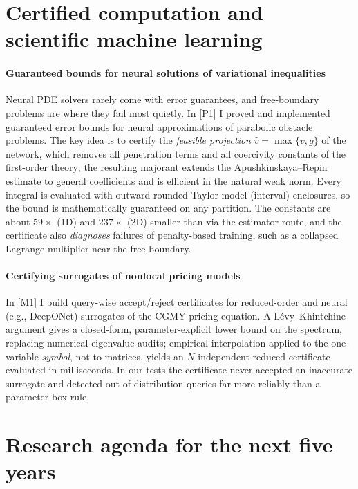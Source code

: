 \documentclass[11pt]{article}
\newcommand{\rc}[1]{\textcolor{accent}{[#1]}}
\begin{document}
\section{Certified computation and scientific machine learning}

\paragraph{Guaranteed bounds for neural solutions of variational inequalities}
Neural PDE solvers rarely come with error guarantees, and free-boundary
problems are where they fail most quietly. In \rc{P1} I proved and implemented
guaranteed error bounds for neural approximations of parabolic obstacle
problems. The key idea is to certify the \emph{feasible projection}
$\hat v=\max\{v,g\}$ of the network, which removes all penetration terms and all
coercivity constants of the first-order theory; the resulting majorant extends
the Apushkinskaya--Repin estimate to general coefficients and is efficient in
the natural weak norm. Every integral is evaluated with outward-rounded
Taylor-model (interval) enclosures, so the bound is mathematically guaranteed on
any partition. The constants are about $59\times$ (1D) and $237\times$ (2D) smaller
than via the estimator route, and the certificate also \emph{diagnoses} failures of penalty-based training, such as a
collapsed Lagrange multiplier near the free boundary.

\paragraph{Certifying surrogates of nonlocal pricing models}
In \rc{M1} I build query-wise accept/reject certificates for reduced-order and
neural (e.g., DeepONet) surrogates of the CGMY pricing equation. A
L\'evy--Khintchine argument gives a closed-form, parameter-explicit lower bound
on the spectrum, replacing numerical eigenvalue audits; empirical interpolation
applied to the one-variable \emph{symbol}, not to matrices, yields an
$N$-independent reduced certificate evaluated in milliseconds. In our tests the
certificate never accepted an inaccurate surrogate and detected
out-of-distribution queries far more reliably than a parameter-box rule. %

\section{Research agenda for the next five years}
\end{document}
